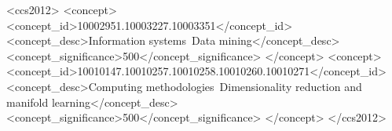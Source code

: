 \documentclass[sigconf]{acmart}
\begin{document}

\begin{CCSXML}
<ccs2012>
   <concept>
       <concept_id>10002951.10003227.10003351</concept_id>
       <concept_desc>Information systems~Data mining</concept_desc>
       <concept_significance>500</concept_significance>
       </concept>
   <concept>
       <concept_id>10010147.10010257.10010258.10010260.10010271</concept_id>
       <concept_desc>Computing methodologies~Dimensionality reduction and manifold learning</concept_desc>
       <concept_significance>500</concept_significance>
       </concept>
 </ccs2012>
\end{CCSXML}


\end{document}

